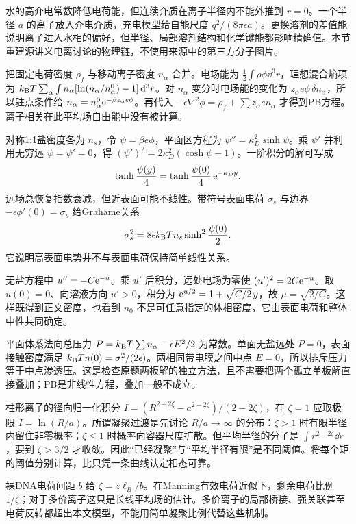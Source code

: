水的高介电常数降低电荷能，但连续介质在离子半径内不能外推到 $r=0$。一个半径 $a$ 的离子放入介电介质，充电模型给自能尺度 $q^2/(8\pi\epsilon a)$。更换溶剂的差值能说明离子进入水相的偏好，但半径、局部溶剂结构和化学键能都影响精确值。本节重建源讲义电离讨论的物理链，不使用来源中的第三方分子图片。

把固定电荷密度 $\rho_f$ 与移动离子密度 $n_\alpha$ 合并。电场能为 $\tfrac12\int\rho\phi\dd^3r$，理想混合熵项为 $k_{\mathrm B} T\sum_\alpha\int n_\alpha[\ln(n_\alpha/n_\alpha^0)-1]\,\mathrm d^3r$。对 $n_\alpha$ 变分时电场能的变化为 $z_\alpha e\phi\,\delta n_\alpha$，所以驻点条件给 $n_\alpha=n_\alpha^0\mathrm e^{-\beta z_\alpha e\phi}$。再代入 $-\epsilon\nabla^2\phi=\rho_f+\sum z_\alpha en_\alpha$ 才得到PB方程。离子相关在此平均场自由能中没有被计算。

对称1:1盐密度各为 $n_s$，令 $\psi=\beta e\phi$，平面区方程为 $\psi''=\kappa_D^2\sinh\psi$。乘 $\psi'$ 并利用无穷远 $\psi=\psi'=0$，得 $(\psi')^2=2\kappa_D^2(\cosh\psi-1)$。一阶积分的解可写成
\[
\tanh\frac{\psi(y)}4=\tanh\frac{\psi(0)}4\,\mathrm e^{-\kappa_Dy}.
\]
远场总恢复指数衰减，但近表面可能不线性。带符号表面电荷 $\sigma_s$ 与边界 $-\epsilon\phi'(0)=\sigma_s$ 给Grahame关系
\[
\sigma_s^2=8\epsilon k_{\mathrm B} T n_s\sinh^2\frac{\psi(0)}2.
\]
它说明高表面电势并不与表面电荷保持简单线性关系。

无盐方程中 $u''=-C\mathrm e^{-u}$。乘 $u'$ 后积分，远处电场为零使 $(u')^2=2C\mathrm e^{-u}$。取 $u(0)=0$、向溶液方向 $u'>0$，积分为 $\mathrm e^{u/2}=1+\sqrt{C/2}\,y$，故 $\mu=\sqrt{2/C}$。这样既得到正文密度，也看到 $n_0$ 不是可任意指定的体相密度，它由表面电荷和整体中性共同确定。

平面体系法向总压力 $P=k_{\mathrm B} T\sum n_\alpha-\epsilon E^2/2$ 为常数。单面无盐远处 $P=0$，表面接触密度满足 $k_{\mathrm B} T n(0)=\sigma^2/(2\epsilon)$。两相同带电膜之间中点 $E=0$，所以排斥压力等于中点渗透压。这是检查原题两板解的独立方法，且不需要把两个孤立单板解直接叠加；PB是非线性方程，叠加一般不成立。

柱形离子的径向归一化积分 $I=(R^{2-2\zeta}-a^{2-2\zeta})/(2-2\zeta)$，在 $\zeta=1$ 应取极限 $I=\ln(R/a)$。所谓凝聚过渡是先讨论 $R/a\to\infty$ 的分布：$\zeta>1$ 时有限半径内留住非零概率；$\zeta\le1$ 时概率向容器尺度扩散。但平均半径的分子是 $\int r^{2-2\zeta}\dd r$，要到 $\zeta>3/2$ 才收敛。因此“已经凝聚”与“平均半径有限”是不同阈值。将每个矩的阈值分别计算，比只凭一条曲线认定相态可靠。

裸DNA电荷间距 $b$ 给 $\zeta=z\ell_B/b$。在Manning有效电荷近似下，剩余电荷比例 $1/\zeta$；对于多价离子这只是长线平均场的估计。多价离子的局部桥接、强关联甚至电荷反转都超出本文模型，不能用简单凝聚比例代替这些机制。
